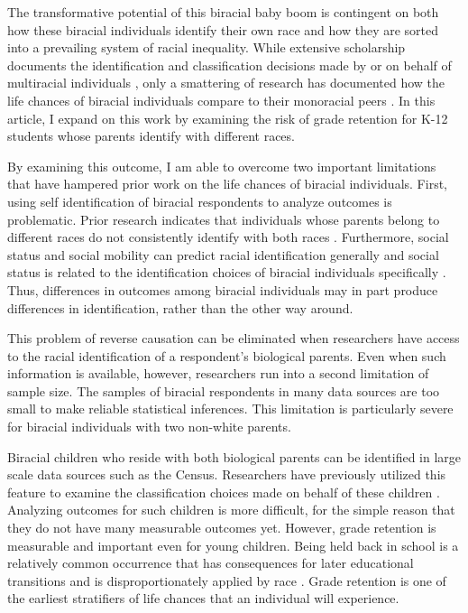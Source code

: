 \documentclass[
  12pt,
  letterpaper,
]{article}
\begin{document}
The transformative potential of this biracial baby boom is contingent on
both how these biracial individuals identify their own race and how they
are sorted into a prevailing system of racial inequality. While
extensive scholarship documents the identification and classification
decisions made by or on behalf of multiracial individuals
\autocite{xie_racial_1997,qian_options_2004,roth_end_2005a,brunsma_interracial_2005,herman_forced_2004,holloway_place_2009,bratter_mother_2009,davenport_role_2016,liebler_boundaries_2016},
only a smattering of research has documented how the life chances of
biracial individuals compare to their monoracial peers
\autocite{kao_racial_1999,campbell_multiracial_2009,herman_blackwhiteother_2009}.
In this article, I expand on this work by examining the risk of grade
retention for K-12 students whose parents identify with different races.

By examining this outcome, I am able to overcome two important
limitations that have hampered prior work on the life chances of
biracial individuals. First, using self identification of biracial
respondents to analyze outcomes is problematic. Prior research indicates
that individuals whose parents belong to different races do not
consistently identify with both races
\autocite{doyle_are_2007,liebler_america_2017,gullickson_racial_2019}.
Furthermore, social status and social mobility can predict racial
identification generally
\autocite{saperstein_racial_2012,saperstein_mulatto_2013} and social
status is related to the identification choices of biracial individuals
specifically \autocite{roth_end_2005a,davenport_role_2016}. Thus,
differences in outcomes among biracial individuals may in part produce
differences in identification, rather than the other way around.

This problem of reverse causation can be eliminated when researchers
have access to the racial identification of a respondent's biological
parents. Even when such information is available, however, researchers
run into a second limitation of sample size. The samples of biracial
respondents in many data sources are too small to make reliable
statistical inferences. This limitation is particularly severe for
biracial individuals with two non-white parents.

Biracial children who reside with both biological parents can be
identified in large scale data sources such as the Census. Researchers
have previously utilized this feature to examine the classification
choices made on behalf of these children
\autocite{xie_racial_1997,roth_end_2005a}. Analyzing outcomes for such
children is more difficult, for the simple reason that they do not have
many measurable outcomes yet. However, grade retention is measurable and
important even for young children. Being held back in school is a
relatively common occurrence that has consequences for later educational
transitions \autocite{jimerson_metaanalysis_2001} and is
disproportionately applied by race \autocite{warren_patterns_2014}.
Grade retention is one of the earliest stratifiers of life chances that
an individual will experience.
\end{document}
